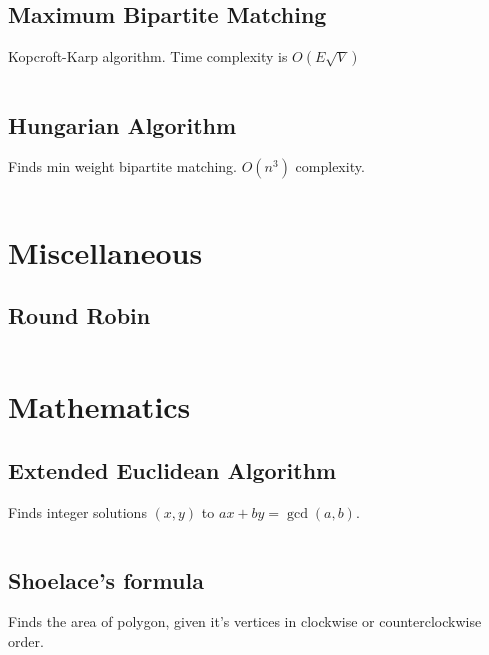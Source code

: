 \documentclass[8pt,a4paper,landscape,oneside]{amsart}
\newcommand{\code}[1]{\inputminted[fontsize=\normalsize,baselinestretch=1]{cpp}{_code/#1}}
\begin{document}
\begin{multicols*}{3}
	\subsection{Maximum Bipartite Matching}
	
	Kopcroft-Karp algorithm. Time complexity is $O(E\sqrt{V})$
	
	\code{graphs/bipartite_matching.cpp}
	
	\subsection{Hungarian Algorithm}
	
	Finds min weight bipartite matching. $O(n^3)$ complexity.
	
	\code{graphs/hungarian_algorithm.cpp}

\section{Miscellaneous}

	\subsection{Round Robin}
	
	\code{miscellaneous/round_robin.cpp}

\section{Mathematics}

	\subsection{Extended Euclidean Algorithm}
	
	Finds integer solutions $(x, y)$ to $ax + by = \gcd(a, b)$.
	
	\code{math/extended_euclidean_algorithm.cpp}
	
	\subsection{Shoelace's formula}
	
	Finds the area of polygon, given it's vertices in clockwise or counterclockwise order.
	
	\code{math/geometry/shoelace.cpp}

\end{multicols*}
\end{document}
